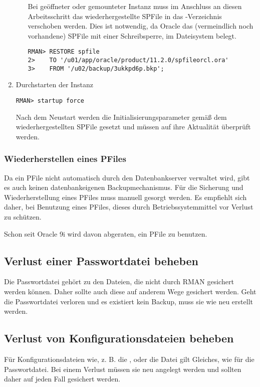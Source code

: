 \begin{enumerate}
\begin{itemize}
								Bei geöffneter oder gemounteter Instanz muss im Anschluss an diesen Arbeitsschritt das wiederhergestellte SPFile in das -Verzeichnis verschoben werden. Dies ist notwendig, da Oracle das (vermeindlich noch vorhandene) SPFile mit einer Schreibsperre, im Dateisystem belegt.
								\begin{lstlisting}[caption={Wiederherstellen des SPFiles in der MOUNT-Phase},label=admin1427,language=rman]
RMAN> RESTORE spfile
2>    TO '/u01/app/oracle/product/11.2.0/spfileorcl.ora'
3>    FROM '/u02/backup/3ukkpd6p.bkp';
                  \end{lstlisting}
              \end{itemize}
            \item Durchstarten der Instanz
              \begin{lstlisting}[caption={Neustart der Instanz},label=admin1428,language=rman,alsolanguage=sqlplus]
RMAN> startup force
              \end{lstlisting}
              Nach dem Neustart werden die Initialisierungsparameter gemäß dem wiederhergestellten SPFile gesetzt und müssen auf ihre Aktualität überprüft werden.
            \end{enumerate}
        \subsubsection{Wiederherstellen eines PFiles}
          Da ein PFile nicht automatisch durch den Datenbankserver verwaltet wird, gibt es auch keinen datenbankeigenen Backupmechanismus. Für die Sicherung und Wiederherstellung eines PFiles muss manuell gesorgt werden. Es empfiehlt sich daher, bei Benutzung eines PFiles, dieses durch Betriebssystemmittel vor Verlust zu schützen.
          \begin{merke}
            Schon seit Oracle 9i wird davon abgeraten, ein PFile zu benutzen.
          \end{merke}
      \subsection{Verlust einer Passwortdatei beheben}
        Die Passwortdatei gehört zu den Dateien, die nicht durch RMAN gesichert werden können. Daher sollte auch diese auf anderem Wege gesichert werden. Geht die Passwortdatei verloren und es existiert kein Backup, muss sie wie neu erstellt werden.
      \subsection{Verlust von Konfigurationsdateien beheben}
        Für Konfigurationsdateien wie, z. B. die ,  oder die Datei  gilt Gleiches, wie für die Passwortdatei. Bei einem Verlust müssen sie neu angelegt werden und sollten daher auf jeden Fall gesichert werden.

